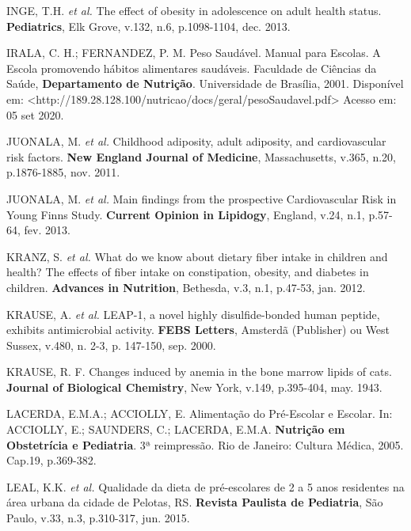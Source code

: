 \bigbreak

\noindent INGE, T.H. \textit{et al.} The effect of obesity in adolescence on adult health status. \textbf{Pediatrics}, Elk Grove, v.132, n.6, p.1098-1104, dec. 2013. 

\bigbreak

\noindent IRALA, C. H.; FERNANDEZ, P. M. Peso Saudável. Manual para Escolas. A Escola promovendo hábitos alimentares saudáveis. Faculdade de Ciências da Saúde, \textbf{Departamento de Nutrição}. Universidade de Brasília, 2001. Disponível em: <http://189.28.128.100/nutricao/docs/geral/pesoSaudavel.pdf> Acesso em: 05 set 2020. 

\bigbreak

\noindent JUONALA, M. \textit{et al.} Childhood adiposity, adult adiposity, and cardiovascular risk factors. \textbf{New England Journal of Medicine}, Massachusetts, v.365, n.20, p.1876-1885, nov. 2011.

\bigbreak

\noindent JUONALA, M. \textit{et al.} Main findings from the prospective Cardiovascular Risk in Young Finns Study. \textbf{Current Opinion in Lipidogy}, England, v.24, n.1, p.57-64, fev. 2013.

\bigbreak

\noindent KRANZ, S. \textit{et al.} What do we know about dietary fiber intake in children and health? The effects of fiber intake on constipation, obesity, and diabetes in children. \textbf{Advances in Nutrition}, Bethesda, v.3, n.1, p.47-53, jan. 2012.

\bigbreak

\noindent KRAUSE, A. \textit{et al.} LEAP-1, a novel highly disulfide-bonded human peptide, exhibits antimicrobial activity. \textbf{FEBS Letters}, Amsterdã (Publisher) ou West Sussex, v.480, n. 2-3, p. 147-150, sep. 2000.
\bigbreak

\noindent KRAUSE, R. F. Changes induced by anemia in the bone marrow lipids of cats. \textbf{Journal of Biological Chemistry}, New York, v.149, p.395-404, may. 1943.

\bigbreak

\noindent LACERDA, E.M.A.; ACCIOLLY, E. Alimentação do Pré-Escolar e Escolar. In: ACCIOLLY, E.; SAUNDERS, C.; LACERDA, E.M.A. \textbf{Nutrição em Obstetrícia e Pediatria}. 3ª reimpressão. Rio de Janeiro: Cultura Médica, 2005. Cap.19, p.369-382. 

\bigbreak

\noindent LEAL, K.K. \textit{et al.} Qualidade da dieta de pré-escolares de 2 a 5 anos residentes na área urbana da cidade de Pelotas, RS. \textbf{Revista Paulista de Pediatria}, São Paulo, v.33, n.3, p.310-317, jun. 2015.

